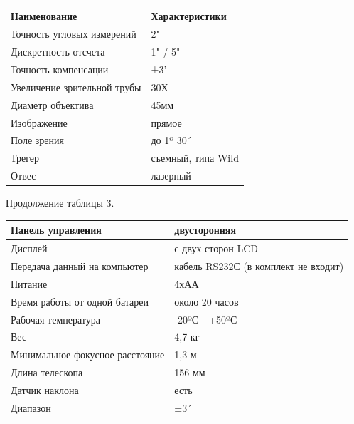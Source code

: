 \documentclass[a4paper]{article}
\begin{document}
\begin{newpage}
\begin{center}
        \begin{tabular}{ | p{200pt} | p{260pt} | }
            \hline
            Наименование & Характеристики\\
            \hline
            Точность угловых измерений  & 2"\\
            \hline
            Дискретность отсчета & 1" / 5"\\
            \hline
            Точность компенсации & ±3'\\
            \hline
            Увеличение зрительной трубы & 30Х\\
            \hline
            Диаметр объектива  & 45мм\\
            \hline
            Изображение & прямое\\
            \hline
            Поле зрения & до 1º 30´\\
            \hline
            Трегер & съемный, типа Wild\\
            \hline
            Отвес & лазерный\\
            \hline
        \end{tabular}
    \end{center}
    
\end{newpage}

\begin{newpage}
        
    \begin{center}
        \begin{flushleft}
            Продолжение таблицы 3.
        \end{flushleft}
        
        \begin{tabular}{ | p{200pt} | p{260pt} | }
            \hline
            Панель управления & двусторонняя\\
            \hline
            Дисплей & с двух сторон LCD\\
            \hline
            Передача данный на компьютер & кабель RS232С (в комплект не входит)\\
            \hline
            Питание & 4хАА\\
            \hline
            Время работы от одной батареи & около 20 часов\\
            \hline
            Рабочая температура & -20ºС - +50ºС\\
            \hline
            Вес & 4,7 кг\\
            \hline
            Минимальное фокусное расстояние & 1,3 м\\
            \hline
            Длина телескопа & 156 мм\\
            \hline
            Датчик наклона & есть\\
            \hline
            Диапазон & ±3´\\
            \hline
        \end{tabular}
    \end{center}
    
\end{newpage}
\end{document}
